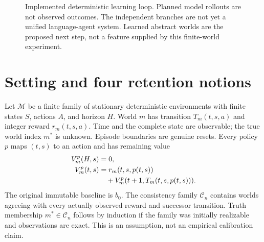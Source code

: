 \documentclass[10pt,twocolumn]{article}
\newcommand{\C}{\mathcal C}
\newcommand{\M}{\mathcal M}
\begin{document}
\begin{figure}[t]
\centering
{}
\caption{Implemented deterministic learning loop. Planned model rollouts are not
observed outcomes. The independent branches are not yet a unified language-agent
system. Learned abstract worlds are the proposed next step, not a feature supplied
by this finite-world experiment.}
\label{fig:loop}
\end{figure}

\section{Setting and four retention notions}
Let $\M$ be a finite family of stationary deterministic environments with finite
states $S$, actions $A$, and horizon $H$. World $m$ has transition
$T_m(t,s,a)$ and integer reward $r_m(t,s,a)$. Time and the complete state are
observable; the true world index $m^*$ is unknown. Episode boundaries are genuine
resets. Every policy $p$ maps $(t,s)$ to an action and has remaining value
\begin{align}
 V_m^p(H,s)&=0,\\
 V_m^p(t,s)&=r_m(t,s,p(t,s))\notag\\
 &\quad+V_m^p(t+1,T_m(t,s,p(t,s))).\label{eq:value}
\end{align}
The original immutable baseline is $b_0$. The consistency family $\C_n$ contains
worlds agreeing with every actually observed reward and successor transition.
Truth membership $m^*\in\C_n$ follows by induction if the family was initially
realizable and observations are exact. This is an assumption, not an empirical
calibration claim.
\end{document}
